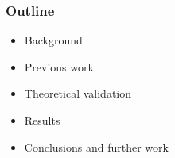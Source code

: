 \begin{frame}
  \frametitle{Outline}
	\begin{itemize}
		\item Background
		\item Previous work
		\item Theoretical validation
		\item Results
		\item Conclusions and further work
	\end{itemize}
\end{frame}
